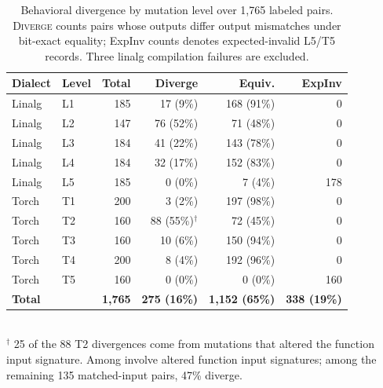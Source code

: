\documentclass[sigplan,screen,review,anonymous]{acmart}
\providecommand{\DIFadd}[1]{{\protect\color{blue} \sf #1}} %
\providecommand{\DIFdel}[1]{{\protect\color{red} \scriptsize #1}} %
\providecommand{\DIFaddFL}[1]{\DIFadd{#1}} %
\providecommand{\DIFdelFL}[1]{\DIFdel{#1}} %
\providecommand{\DIFaddbeginFL}{} %
\providecommand{\DIFaddendFL}{} %
\providecommand{\DIFdelbeginFL}{} %
\providecommand{\DIFdelendFL}{} %
\begin{document}
\begin{table}[t]
\centering
\caption{Behavioral divergence by mutation level over 1{,}765 labeled pairs.
\textsc{Diverge} counts \DIFdelbeginFL \DIFdelFL{pairs whose outputs differ }\DIFdelendFL \DIFaddbeginFL \DIFaddFL{output mismatches }\DIFaddendFL under bit-exact equality; ExpInv
\DIFdelbeginFL \DIFdelFL{counts }\DIFdelendFL \DIFaddbeginFL \DIFaddFL{denotes }\DIFaddendFL expected-invalid L5/T5 records.\DIFdelbeginFL \DIFdelFL{Three linalg compilation failures are excluded.}\DIFdelendFL }
\label{tab:divergence}
\small
\begin{tabular}{llrrrr}
\toprule
Dialect & Level & Total & Diverge & Equiv. & ExpInv \\
\midrule
Linalg & L1 & 185 & 17 (9\%)  & 168 (91\%) & 0   \\
Linalg & L2 & 147 & 76 (52\%) & 71 (48\%)  & 0   \\
Linalg & L3 & 184 & 41 (22\%) & 143 (78\%) & 0   \\
Linalg & L4 & 184 & 32 (17\%) & 152 (83\%) & 0   \\
Linalg & L5 & 185 & 0 (0\%)   & 7 (4\%)    & 178 \\
\midrule
Torch  & T1 & 200 & 3 (2\%)   & 197 (98\%) & 0   \\
Torch  & T2 & 160 & 88 (55\%)$^\dagger$ & 72 (45\%) & 0 \\
Torch  & T3 & 160 & 10 (6\%)  & 150 (94\%) & 0   \\
Torch  & T4 & 200 & 8 (4\%)   & 192 (96\%) & 0   \\
Torch  & T5 & 160 & 0 (0\%)   & 0 (0\%)    & 160 \\
\midrule
\multicolumn{2}{l}{\textbf{Total}} & \textbf{1{,}765}
  & \textbf{275 (16\%)} & \textbf{1{,}152 (65\%)} & \textbf{338 (19\%)} \\
\bottomrule
\end{tabular}
\\[3pt]
{\footnotesize $^\dagger$ 25 \DIFdelbeginFL \DIFdelFL{of the 88 }\DIFdelendFL T2 divergences \DIFdelbeginFL \DIFdelFL{come from mutations that altered the function input
signature. Among }\DIFdelendFL \DIFaddbeginFL \DIFaddFL{involve altered function input
signatures; among }\DIFaddendFL the remaining 135 matched-input pairs, 47\% diverge.}
\end{table}
\end{document}
